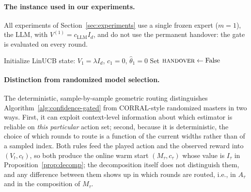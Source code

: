\documentclass[anon]{alt2027} %
\begin{document}
\paragraph{The instance used in our experiments.}
All experiments of Section~\ref{sec:experiments} use a single frozen expert
($m=1$), the LLM, with $V^{(1)}=c_{\mathrm{LLM}}I_d$, and do not use the permanent handover:
the gate is evaluated on every round.

\begin{algorithm2e}[!htb]
\caption{Confidence-Gated Master over Frozen Policies and LinUCB}
\label{alg:confidence-gated}
\DontPrintSemicolon
\LinesNumbered
{}
Initialize LinUCB state: $V_1=\lambda I_d$, $c_1=0$, $\widehat{\theta}_1=0$\;
Set $\textsc{handover}\gets \mathrm{False}$\;
\end{algorithm2e}

\paragraph{Distinction from randomized model selection.}
The deterministic, sample-by-sample geometric routing distinguishes
Algorithm~\ref{alg:confidence-gated} from CORRAL-style randomized
masters in two ways. First, it can exploit context-level information
about which estimator is reliable on \emph{this particular} action
set; second, because it is deterministic, the choice of which rounds to route
is a function of the current widths rather than of a sampled index. Both
rules feed the played action and the observed reward into $(V_t,c_t)$, so
both produce the online warm start $(M_\tau,c_\tau)$ whose value is
$I_\tau$ in Proposition~\ref{prop:decomp}; the decomposition itself does not
distinguish them, and any difference between them shows up in which rounds
are routed, i.e., in $A_\tau$ and in the composition of $M_\tau$.
\end{document}
